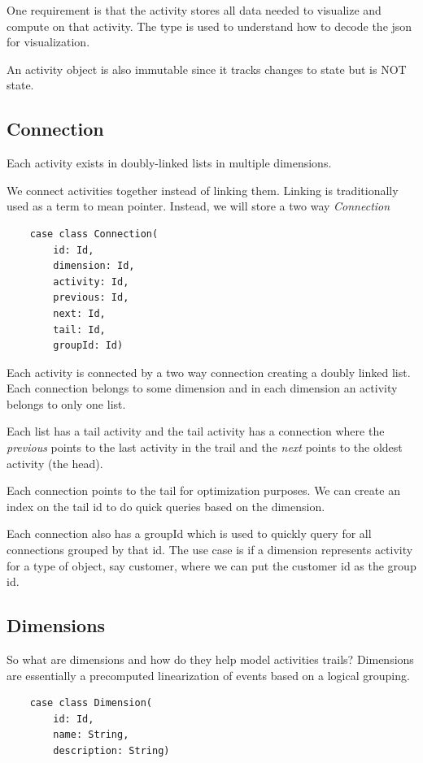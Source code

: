 \documentclass[11pt]{article}
\begin{document}
One requirement is that the activity stores all data needed to visualize and compute on that activity. The type is used to understand how to decode the json for visualization.

An activity object is also immutable since it tracks changes to state but is NOT state.

\subsection{Connection}

Each activity exists in doubly-linked lists in multiple dimensions.

We connect activities together instead of linking them. Linking is traditionally used
as a term to mean pointer. Instead, we will store a two way \emph{Connection}

\begin{lstlisting}
    case class Connection(
        id: Id, 
        dimension: Id, 
        activity: Id, 
        previous: Id, 
        next: Id, 
        tail: Id,
        groupId: Id)
\end{lstlisting}

Each activity is connected by a two way connection creating a doubly linked list. Each
connection belongs to some dimension and in each dimension an activity belongs to only
one list. 

Each list has a tail activity and the tail activity has a connection where
the \emph{previous} points to the last activity in the trail and the \emph{next} points to the oldest activity (the head).

Each connection points to the tail for optimization purposes. We can create an
index on the tail id to do quick queries based on the dimension.

Each connection also has a groupId which is used to quickly query for all connections grouped
by that id. The use case is if a dimension represents activity for a type of object, say customer,
where we can put the customer id as the group id. 

\subsection{Dimensions}

So what are dimensions and how do they help model activities trails? Dimensions are essentially
a precomputed linearization of events based on a logical grouping.

\begin{lstlisting}
    case class Dimension(
        id: Id, 
        name: String, 
        description: String)
\end{lstlisting}
\end{document}
